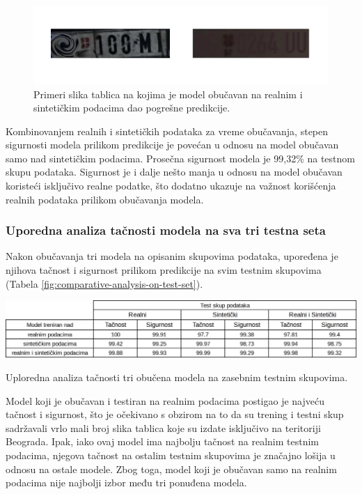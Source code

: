 \documentclass[a4paper,12pt]{article}
\begin{document}
	\begin{figure}[H]
		\centering
		\includegraphics[width=\textwidth]{assets/bad-predictions-real-and-synthetic-data-model.png}
		\caption{Primeri slika tablica na kojima je model obučavan na realnim i sintetičkim podacima dao pogrešne predikcije.}
		\label{fig:bad-predictions-real-and-synthetic-data-model}
	\end{figure}
	
	Kombinovanjem realnih i sintetičkih podataka za vreme obučavanja, stepen sigurnosti modela prilikom predikcije je povećan u odnosu na model obučavan samo nad sintetičkim podacima. Prosečna sigurnost modela je 99,32\% na testnom skupu podataka. Sigurnost je i dalje nešto manja u odnosu na model obučavan koristeći isključivo realne podatke, što dodatno ukazuje na važnost korišćenja realnih podataka prilikom obučavanja modela.
	
	\subsubsection{Uporedna analiza tačnosti modela na sva tri testna seta}

	Nakon obučavanja tri modela na opisanim skupovima podataka, upoređena je njihova tačnost i sigurnost prilikom predikcije na svim testnim skupovima (Tabela \ref{fig:comparative-analysis-on-test-set}).
	
	\begin{table}[H]
		\centering
		\includegraphics[width=\textwidth]{assets/comparative-analysis-on-test-set.png}
		\caption{Uploredna analiza tačnosti tri obučena modela na zasebnim testnim skupovima.}
		\label{fig:comparative-analysis-on-test-set}
	\end{table}
	
	Model koji je obučavan i testiran na realnim podacima postigao je najveću tačnost i sigurnost, što je očekivano s obzirom na to da su trening i testni skup sadržavali vrlo mali broj slika tablica koje su izdate isključivo na teritoriji Beograda. Ipak, iako ovaj model ima najbolju tačnost na realnim testnim podacima, njegova tačnost na ostalim testnim skupovima je značajno lošija u odnosu na ostale modele. Zbog toga, model koji je obučavan samo na realnim podacima nije najbolji izbor među tri ponuđena modela.
	
\end{document}
